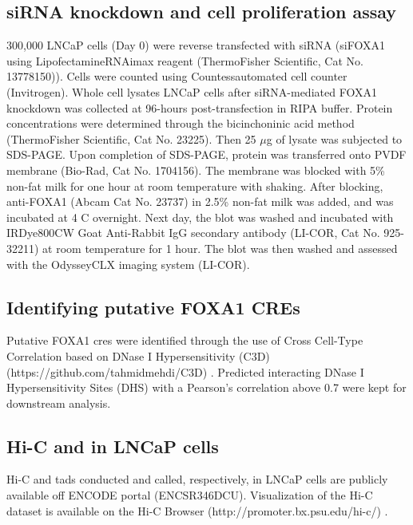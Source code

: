 \subsection{siRNA knockdown and cell proliferation assay}

300,000 LNCaP cells (Day 0) were reverse transfected with siRNA (siFOXA1 using Lipofectamine\textregistered RNAimax reagent (ThermoFisher Scientific, Cat No. 13778150)).
Cells were counted using Countess\texttrademark automated cell counter (Invitrogen).
Whole cell lysates LNCaP cells after siRNA-mediated FOXA1 knockdown was collected at 96-hours post-transfection in RIPA buffer.
Protein concentrations were determined through the bicinchoninic acid method (ThermoFisher Scientific, Cat No. 23225).
Then 25 $\mu$g of lysate was subjected to SDS-PAGE.
Upon completion of SDS-PAGE, protein was transferred onto PVDF membrane (Bio-Rad, Cat No. 1704156).
The membrane was blocked with 5\% non-fat milk for one hour at room temperature with shaking.
After blocking, anti-FOXA1 (Abcam Cat No. 23737) in 2.5\% non-fat milk was added, and was incubated at 4 \textdegree C overnight.
Next day, the blot was washed and incubated with IRDye\textregistered 800CW Goat Anti-Rabbit IgG secondary antibody (LI-COR, Cat No. 925-32211) at room temperature for 1 hour.
The blot was then washed and assessed with the Odyssey\textregistered CLX imaging system (LI-COR).

\subsection{Identifying putative FOXA1 CREs}

Putative FOXA1 \glspl{cre} were identified through the use of Cross Cell-Type Correlation based on DNase I Hypersensitivity (C3D) (https://github.com/tahmidmehdi/C3D) \cite{mehdiC3DToolPredict2019}.
Predicted interacting DNase I Hypersensitivity Sites (DHS) with a Pearson's correlation above 0.7 \cite{thurmanAccessibleChromatinLandscape2012} were kept for downstream analysis.

\subsection{Hi-C and  in LNCaP cells}

Hi-C and \glspl{tad} conducted and called, respectively, in LNCaP cells are publicly available off ENCODE portal (ENCSR346DCU).
Visualization of the Hi-C dataset is available on the Hi-C Browser (http://promoter.bx.psu.edu/hi-c/) \cite{wang3DGenomeBrowser2018}.

